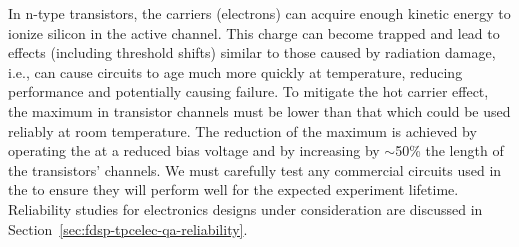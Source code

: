In n-type  transistors, the carriers (electrons)
can acquire enough kinetic energy to ionize silicon in the active channel. This
charge can become trapped and lead to effects (including threshold shifts)
similar to those caused by radiation damage, i.e., can cause 
circuits to age much more quickly at  temperature, 
reducing performance and potentially causing failure. To mitigate the hot carrier effect,
the maximum \efield in transistor channels must be lower than 
that which could be used reliably at room temperature. The reduction of
the maximum \efield is achieved by operating the  at a
reduced bias voltage and by increasing by $\sim$50\% the length 
of the transistors' channels. We must carefully test any commercial 
circuits used in the  to ensure they will perform well for 
the expected experiment lifetime. Reliability studies for  
electronics designs under consideration are discussed in Section~\ref{sec:fdsp-tpcelec-qa-reliability}.
